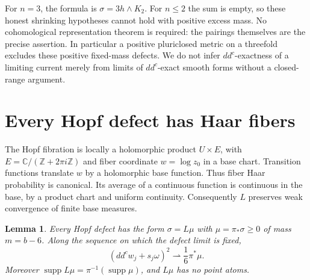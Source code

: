 \documentclass[11pt]{article}
\newtheorem{lemma}{Lemma}
\newcommand{\ddc}{dd^c}
\begin{document}
For $n=3$, the formula is $\sigma=3h\wedge K_2$.
For $n\leq2$ the sum is empty, so these honest shrinking hypotheses
cannot hold with positive excess mass. No cohomological
representation theorem is required: the pairings themselves are
the precise assertion. In particular a positive pluriclosed metric
on a threefold excludes these positive fixed-mass defects. We do not
infer $dd^c$-exactness of a limiting current merely from limits of
$dd^c$-exact smooth forms without a closed-range argument.

\section{Every Hopf defect has Haar fibers}
The Hopf fibration is locally a holomorphic product $U\times E$,
with $E=\mathbb C/(\mathbb Z+2\pi i\mathbb Z)$ and fiber coordinate
$w=\log z_0$ in a base chart. Transition functions translate $w$
by a holomorphic base function. Thus fiber Haar probability is
canonical. Its average of a continuous function is continuous in the
base, by a product chart and uniform continuity. Consequently $L$
preserves weak convergence of finite base measures.

\begin{lemma}\label{lem:necessity}
Every Hopf defect has the form $\sigma=L\mu$ with
$\mu=\pi_*\sigma\geq0$ of mass $m=b-6$. Along the sequence on which
the defect limit is fixed,
\[
 (\ddc w_j+s_j\omega)^2\rightharpoonup\frac16\pi^*\mu.
\]
Moreover $\operatorname{supp}L\mu=\pi^{-1}(\operatorname{supp}\mu)$,
and $L\mu$ has no point atoms.
\end{lemma}
\end{document}
